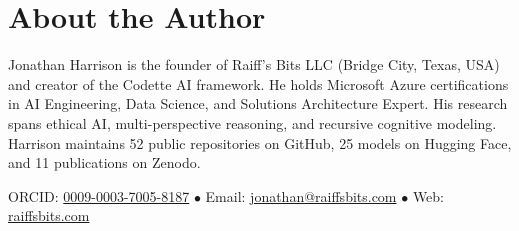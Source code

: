 \documentclass[11pt,a4paper]{article}
\begin{document}
\section*{About the Author}
Jonathan Harrison is the founder of Raiff's Bits LLC (Bridge City, Texas, USA) and creator of the Codette AI framework. He holds Microsoft Azure certifications in AI Engineering, Data Science, and Solutions Architecture Expert. His research spans ethical AI, multi-perspective reasoning, and recursive cognitive modeling. Harrison maintains 52 public repositories on GitHub, 25 models on Hugging Face, and 11 publications on Zenodo.

\medskip
\noindent ORCID: \href{https://orcid.org/0009-0003-7005-8187}{0009-0003-7005-8187} \quad $\bullet$ \quad Email: \href{mailto:jonathan@raiffsbits.com}{jonathan@raiffsbits.com} \quad $\bullet$ \quad Web: \href{https://raiffsbits.com}{raiffsbits.com}
\end{document}
